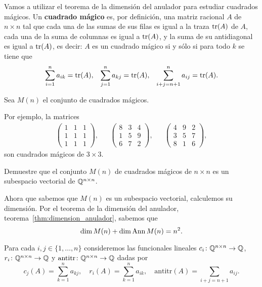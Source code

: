 \begin{block}
	\label{block:magic_squares}
    Vamos a utilizar el teorema de la dimensión del anulador para estudiar
    cuadrados mágicos. Un \textbf{cuadrado mágico} es, por definición, una
    matriz racional $A$ de $n\times n$ tal que cada una de las sumas de sus filas
    es igual a la traza $\operatorname{tr}(A)$ de $A$, cada una de la suma de columnas es
    igual a $\operatorname{tr}(A)$, y la suma de su antidiagonal es igual a $\operatorname{tr}(A)$, es
    decir: $A$ es un cuadrado mágico si y sólo si para todo $k$ se tiene que
    \begin{align*}
        \sum_{i=1}^n a_{ik}=\operatorname{tr}(A), &&
        \sum_{j=1}^n a_{kj}=\operatorname{tr}(A), &&
        \sum_{i+j=n+1}^n a_{ij}=\operatorname{tr}(A).
    \end{align*}

    Sea $M(n)$ el conjunto de cuadrados mágicos. 

	Por ejemplo, la matrices
    \begin{align}
        \label{eq:magic}
		\begin{pmatrix}
			1 & 1 & 1\\
			1 & 1 & 1\\
			1 & 1 & 1  
		\end{pmatrix},
         &&
		\begin{pmatrix}
			8 & 3 & 4\\
			1 & 5 & 9\\
			6 & 7 & 2  
		\end{pmatrix},
        &&
		\begin{pmatrix}
			4 & 9 & 2\\
			3 & 5 & 7\\
			8 & 1 & 6  
		\end{pmatrix},
    \end{align}
	son cuadrados mágicos de $3\times 3$. 
    
    \begin{xca*}
        Demuestre que el conjunto $M(n)$ de cuadrados mágicos de $n\times n$ es
        un subespacio vectorial de $\mathbb{Q}^{n\times n}$. 
    \end{xca*}

    Ahora que sabemos que $M(n)$ es un subespacio vectorial, calculemos su
    dimensión. Por el teorema de la dimensión del anulador,
    teorema~\ref{thm:dimension_anulador}, sabemos que
	\[
		\dim M(n)+\dim\operatorname{Ann} M(n)=n^2.
	\]

    Para cada $i,j\in\{1,\dots,n\}$ consideremos las funcionales lineales
    $c_i\colon\mathbb{Q}^{n\times n}\to\mathbb{Q}$, $r_i\colon\mathbb{Q}^{n\times n}\to\mathbb{Q}$ y
    $\mathrm{antitr}\colon\mathbb{Q}^{n\times n}\to\mathbb{Q}$ dadas por
    \[
    c_j(A)=\sum_{k=1}^n a_{kj},\quad
    r_i(A)=\sum_{k=1}^n a_{ik},\quad
    \mathrm{antitr}(A)=\sum_{i+j=n+1}a_{ij}.
    \]


\end{block}
